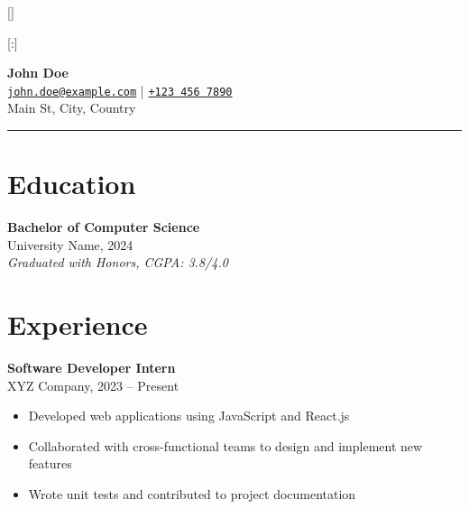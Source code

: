 \titleformat{\section}[block]{\normalfont\Large\bfseries\color{myblue}}{}{0em}{}[\titlerule]
\titleformat{\subsection}[runin]{\normalfont\large\bfseries\color{myblue}}{}{0em}{}[:]

\geometry{top=1in, bottom=1in, left=1in, right=1in}

\setlength{\parskip}{0.5em}



\maketitle
\thispagestyle{empty} %

\noindent
\textbf{\Huge John Doe} \\
\noindent
\href{mailto:john.doe@example.com}{\texttt{john.doe@example.com}} \quad | \quad 
\href{tel:+1234567890}{\texttt{+123 456 7890}} \\
 Main St, City, Country \\
\rule{\textwidth}{0.4pt}  %

\section*{Education}
\noindent
\textbf{Bachelor of Computer Science} \\
University Name, 2024 \\
\textit{Graduated with Honors, CGPA: 3.8/4.0}

\section*{Experience}
\noindent
\textbf{Software Developer Intern} \\
XYZ Company, 2023 -- Present \\
\begin{itemize}[left=0em, labelsep=1em]
    \item Developed web applications using JavaScript and React.js
    \item Collaborated with cross-functional teams to design and implement new features
    \item Wrote unit tests and contributed to project documentation
\end{itemize}

